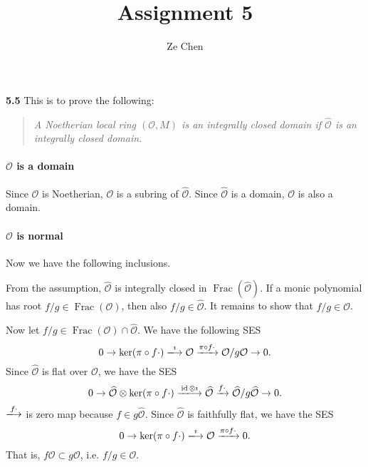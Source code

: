 \documentclass{article}
\title{Assignment 5}
\author{Ze Chen}
\makeatletter
\newcommand*{\shifttext}[1]{%
  \settowidth{\@tempdima}{#1}%
  \hspace{-\@tempdima}#1%
}
\newcommand{\plabel}[1]{%
\shifttext{\textbf{#1}\quad}%
}
\makeatother
\begin{document}
\maketitle

\plabel{5.5}%
This is to prove the following:
\begin{quote}
    \textit{A Noetherian local ring $(\mathcal{O},M)$ is an integrally closed domain if $\widehat{\mathcal{O}}$ is an integrally closed domain.}
\end{quote}
\paragraph{$\mathcal{O}$ is a domain}%
Since $\mathcal{O}$ is Noetherian, $\mathcal{O}$ is a subring of $\widehat{\mathcal{O}}$.
Since $\widehat{\mathcal{O}}$ is a domain, $\mathcal{O}$ is also a domain.
\paragraph{$\mathcal{O}$ is normal}%
Now we have the following inclusions.
\begin{center}
\end{center}
From the assumption, $\widehat{\mathcal{O}}$ is integrally closed in $\operatorname{Frac}(\widehat{\mathcal{O}})$.
If a monic polynomial has root $f/g\in \operatorname{Frac}(\mathcal{O})$, then also $f/g\in \widehat{\mathcal{O}}$.
It remains to show that $f/g\in  \mathcal{O}$.
\par
Now let $f/g\in \operatorname{Frac}(\mathcal{O}) \cap \widehat{\mathcal{O}}$.
We have the following SES
\[ 0 \rightarrow \ker(\pi \circ f\cdot) \xlongrightarrow{\imath} \mathcal{O} \xrightarrow{\pi \circ f\cdot} \mathcal{O}/g\mathcal{O} \rightarrow 0. \]
Since $\widehat{\mathcal{O}}$ is flat over $\mathcal{O}$, we have the SES
\[ 0 \rightarrow \widehat{\mathcal{O}}\otimes \ker(\pi \circ f\cdot) \xlongrightarrow{\operatorname{id} \otimes \imath} \widehat{\mathcal{O}} \xrightarrow{f\cdot} \widehat{\mathcal{O}}/g\widehat{\mathcal{O}} \rightarrow 0. \]
$\xlongrightarrow{f\cdot}$ is zero map because $f\in g\widehat{\mathcal{O}}$.
Since $\widehat{\mathcal{O}}$ is faithfully flat, we have the SES
\[ 0 \rightarrow \ker(\pi \circ f\cdot) \xlongrightarrow{\imath} \mathcal{O} \xrightarrow{\pi \circ f\cdot} 0. \]
That is, $f\mathcal{O} \subset g \mathcal{O}$, i.e. $f/g\in \mathcal{O}$.
\end{document}

